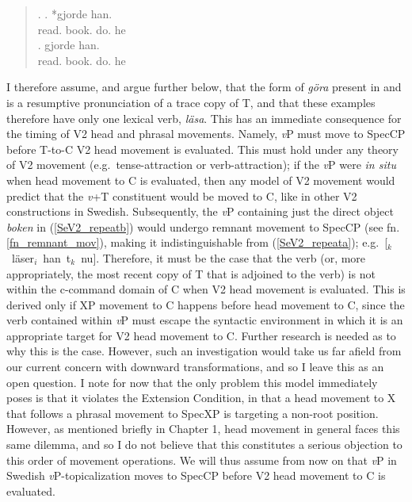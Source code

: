 \singlespacing
\begin{quote}
\begin{minipage}{5.5in}
\ex. \label{SeTIdent}
\ag. * gjorde han. \label{SeTIdenta}\\
\hspace{1pt} read.\mbox{} book.\mbox{} do.\mbox{} he\\
\bg.  gjorde han. \label{SeTIdentb}\\
\hspace{1pt} read. book. do. he\\

\end{minipage}
\end{quote}
\onehalfspacing
I therefore assume, and argue further below, that the form of {\it g\"{o}ra} present in \LLast and \Last[b] is a resumptive pronunciation of a trace copy of T, and that these examples therefore have only one lexical verb, {\it l\"{a}sa}. This has an immediate consequence for the timing of V2 head and phrasal movements. Namely, \textit{v}P must move to SpecCP before T-to-C V2 head movement is evaluated. This must hold under any theory of V2 movement (e.g.\ tense-attraction or verb-attraction); if the \textit{v}P were \textit{in situ} when head movement to C is evaluated, then any model of V2 movement would predict that the \textit{v}+T constituent would be moved to C, like in other V2 constructions in Swedish. Subsequently, the \textit{v}P containing just the direct object \textit{boken} in (\ref{SeV2_repeatb}) would undergo remnant movement to SpecCP (see fn. \ref{fn_remnant_mov}), making it indistinguishable from (\ref{SeV2_repeata}); e.g.\ [\I[vP t$_{i}$~boken]$_{k}$~l\"{a}ser$_{i}$~han~t$_{k}$~nu]. Therefore, it must be the case that the verb (or, more appropriately, the most recent copy of T that is adjoined to the verb) is not within the c-command domain of C when V2 head movement is evaluated. This is derived only if XP movement to C happens before head movement to C, since the verb contained within {\it v}P must escape the syntactic environment in which it is an appropriate target for V2 head movement to C. Further research is needed as to why this is the case. However, such an investigation would take us far afield from our current concern with downward transformations, and so I leave this as an open question. I note for now that the only problem this model immediately poses is that it violates the Extension Condition, in that a head movement to X that follows a phrasal movement to SpecXP is targeting a non-root position. However, as mentioned briefly in Chapter 1, head movement in general faces this same dilemma, and so I do not believe that this constitutes a serious objection to this order of movement operations. We will thus assume from now on that {\it v}P in Swedish {\it v}P-topicalization moves to SpecCP before V2 head movement to C is evaluated.

